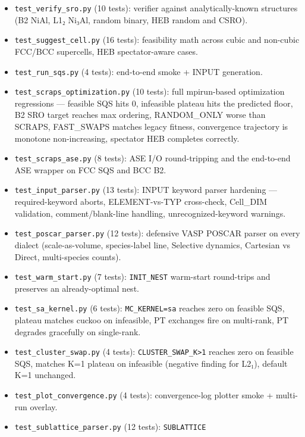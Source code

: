 \documentclass[
  11pt,
]{article}
\providecommand{\tightlist}{%
  \setlength{\itemsep}{0pt}\setlength{\parskip}{0pt}}
\begin{document}
\begin{itemize}
\tightlist
\item
  \texttt{test\_verify\_sro.py} (10 tests): verifier against
  analytically-known structures (B2 NiAl, L1₂ Ni₃Al, random binary, HEB
  random and CSRO).
\item
  \texttt{test\_suggest\_cell.py} (16 tests): feasibility math across
  cubic and non-cubic FCC/BCC supercells, HEB spectator-aware cases.
\item
  \texttt{test\_run\_sqs.py} (4 tests): end-to-end smoke + INPUT
  generation.
\item
  \texttt{test\_scraps\_optimization.py} (10 tests): full mpirun-based
  optimization regressions --- feasible SQS hits 0, infeasible plateau
  hits the predicted floor, B2 SRO target reaches max ordering,
  RANDOM\_ONLY worse than SCRAPS, FAST\_SWAPS matches legacy fitness,
  convergence trajectory is monotone non-increasing, spectator HEB
  completes correctly.
\item
  \texttt{test\_scraps\_ase.py} (8 tests): ASE I/O round-tripping and
  the end-to-end ASE wrapper on FCC SQS and BCC B2.
\item
  \texttt{test\_input\_parser.py} (13 tests): INPUT keyword parser
  hardening --- required-keyword aborts, ELEMENT-vs-TYP cross-check,
  Cell\_DIM validation, comment/blank-line handling,
  unrecognized-keyword warnings.
\item
  \texttt{test\_poscar\_parser.py} (12 tests): defensive VASP POSCAR
  parser on every dialect (scale-as-volume, species-label line,
  Selective dynamics, Cartesian vs Direct, multi-species counts).
\item
  \texttt{test\_warm\_start.py} (7 tests): \texttt{INIT\_NEST}
  warm-start round-trips and preserves an already-optimal nest.
\item
  \texttt{test\_sa\_kernel.py} (6 tests): \texttt{MC\_KERNEL=sa} reaches
  zero on feasible SQS, plateau matches cuckoo on infeasible, PT
  exchanges fire on multi-rank, PT degrades gracefully on single-rank.
\item
  \texttt{test\_cluster\_swap.py} (4 tests):
  \texttt{CLUSTER\_SWAP\_K\textgreater{}1} reaches zero on feasible SQS,
  matches K=1 plateau on infeasible (negative finding for L2₁), default
  K=1 unchanged.
\item
  \texttt{test\_plot\_convergence.py} (4 tests): convergence-log plotter
  smoke + multi-run overlay.
\item
  \texttt{test\_sublattice\_parser.py} (12 tests): \texttt{SUBLATTICE}

\end{itemize}
\end{document}
